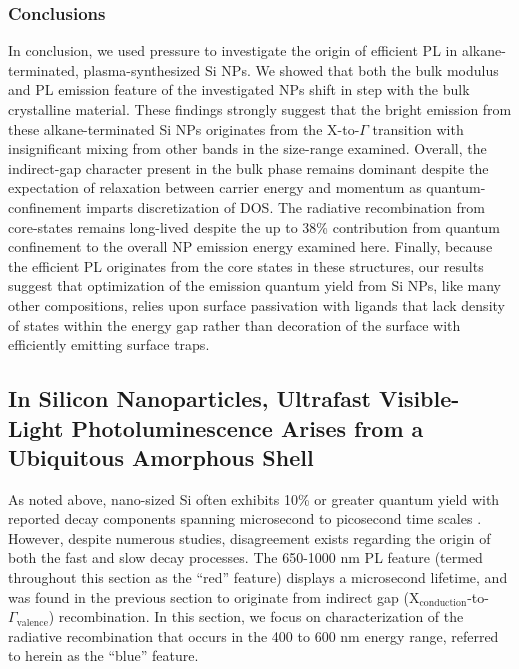\subsubsection{Conclusions}
In conclusion, we used pressure to investigate the origin of efficient PL in alkane-terminated, plasma-synthesized Si NPs. We showed that both the bulk modulus and PL emission feature of the investigated NPs shift in step with the bulk crystalline material. These findings strongly suggest that the bright emission from these alkane-terminated Si NPs originates from the X-to-$\Gamma$ transition with insignificant mixing from other bands in the size-range examined. Overall, the indirect-gap character present in the bulk phase remains dominant despite the expectation of relaxation between carrier energy and momentum as quantum-confinement imparts discretization of DOS. The radiative recombination from core-states remains long-lived despite the up to 38\% contribution from quantum confinement to the overall NP emission energy examined here. Finally, because the efficient PL originates from the core states in these structures, our results suggest that optimization of the emission quantum yield from Si NPs, like many other compositions, relies upon surface passivation with ligands that lack density of states within the energy gap rather than decoration of the surface with efficiently emitting surface traps.

\subsection{In Silicon Nanoparticles, Ultrafast Visible-Light Photoluminescence Arises from a Ubiquitous Amorphous Shell}
As noted above, nano-sized Si often exhibits 10\% or greater quantum yield with reported decay components spanning microsecond to picosecond time scales \cite{PhysRevLett.100.067401,de2010red,english2002size,kusova2010brightly,groenewegen2010excited,PhysRevB.49.16845,PhysRevLett.88.097401,godefroo2008classification,PhysRevB.84.085321,dohnalova2013surface}. However, despite numerous studies, disagreement exists regarding the origin of both the fast and slow decay processes. The 650-1000 nm PL feature (termed throughout this section as the “red” feature) displays a microsecond lifetime, and was found in the previous section to originate from indirect gap (X$_{\mathrm{conduction}}$-to-$\Gamma_{\mathrm{valence}}$) recombination.  In this section, we focus on characterization of the radiative recombination that occurs in the 400 to 600 nm energy range, referred to herein as the “blue” feature. \par

